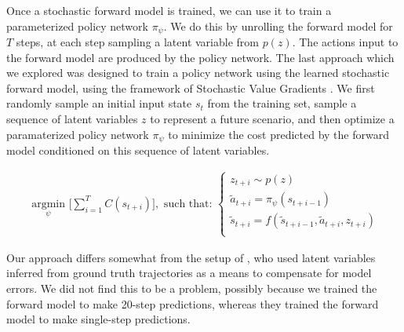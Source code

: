 \documentclass{article} %
\begin{document}
Once a stochastic forward model is trained, we can use it to train a parameterized policy network $\pi_\psi$.
We do this by unrolling the forward model for $T$ steps, at each step sampling a latent variable from $p(z)$.
The actions input to the forward model are produced by the policy network. 
The last approach which we explored was designed to train a policy network using the learned stochastic forward model, using the framework of Stochastic Value Gradients \citep{SVG}.
  We first randomly sample an initial input state $s_t$ from the training set, sample a sequence of latent variables $z$ to represent a future scenario, and then optimize a paramaterized policy network $\pi_\psi$ to minimize the cost predicted by the forward model conditioned on this sequence of latent variables.

    \begin{align*}
    \underset{\psi}{\mbox{ argmin }} \Big[ \sum_{i=1}^{T} C(s_{t+i}) \Big],  \mbox{ such that: }
    \begin{cases}
      z_{t+i} \sim p(z) \\
      \tilde{a}_{t+i} = \pi_\psi(s_{t+i-1}) \\
      \tilde{s}_{t+i} = f(\tilde{s}_{t+i-1}, \tilde{a}_{t+i}, z_{t+i}) \\
      \end{cases}
    \end{align*}

    Our approach differs somewhat from the setup of \citep{SVG}, who used latent variables inferred from ground truth trajectories as a means to compensate for model errors. We did not find this to be a problem, possibly because we trained the forward model to make 20-step predictions, whereas they trained the forward model to make single-step predictions.
  

%
\end{document}

